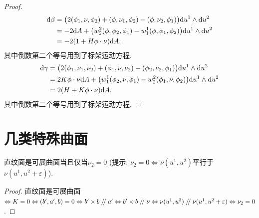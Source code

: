 	\begin{proof}
		\begin{align*}
			\mathrm{d} \beta&=\bigl(2(\phi_{1},\nu,\phi_{2})+(\phi,\nu_{1},\phi_{2})-(\phi,\nu_{2},\phi_{1})\bigr)\mathrm{d} u^{1}\wedge\mathrm{d} u^{2}\\
			&=-2\mathrm{d} A+\bigl(w_{2}^{2}(\phi,\phi_{2},\phi_{1})-w_{1}^{1}(\phi,\phi_{1},\phi_{2})\bigr)\mathrm{d} u^{1}\wedge\mathrm{d} u^{2}\\
			&=-2(1+H \phi \cdot \nu) \mathrm{d} A,
		\end{align*}
		其中倒数第二个等号用到了标架运动方程.
		\begin{align*}
			\mathrm{d} \gamma&=\bigl(2(\phi_{1},\nu_{1},\nu_{2})+(\phi_{1},\nu,\nu_{2})-(\phi_{2},\nu_{2},\phi_{1})\bigr)\mathrm{d} u^{1}\wedge\mathrm{d} u^{2}\\
			&=2K\phi\cdot\nu\mathrm{d} A+\bigl(w_{1}^{1}(\phi_{2},\nu,\phi_{1})-w_{2}^{2}(\phi_{1},\nu,\phi_{2})\bigr)\mathrm{d} u^{1}\wedge\mathrm{d} u^{2}\\
			&=2(H+K \phi \cdot \nu) \mathrm{d} A,
		\end{align*}
		其中倒数第二个等号用到了标架运动方程.
	\end{proof}

\section{几类特殊曲面}
\begin{excise}
		直纹面是可展曲面当且仅当$\nu_{2}=0$ (提示: $\nu_{2}=0\Leftrightarrow \nu(u^{1},u^{2})$平行于$\nu(u^{1},u^{2}+\varepsilon)$).
	\end{excise}
	\begin{proof}
		直纹面是可展曲面$\Leftrightarrow K=0\Leftrightarrow(b',a',b)=0\Leftrightarrow  b'\times b\pll a'\Leftrightarrow b'\times b\pll \nu\Leftrightarrow\nu(u^{1},u^{2})\pll\nu(u^{1},u^{2}+\varepsilon)\Leftrightarrow\nu_{2}=0$.
	\end{proof}

